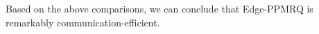 \documentclass[IEEE JOURNAL OF BIOMEDICAL AND HEALTH INFORMATICS]{IEEEtran}
\begin{document}
{\vspace{-0cm}




  Based on the above comparisons, we can conclude that Edge-PPMRQ is remarkably communication-efficient.



}
\end{document}
